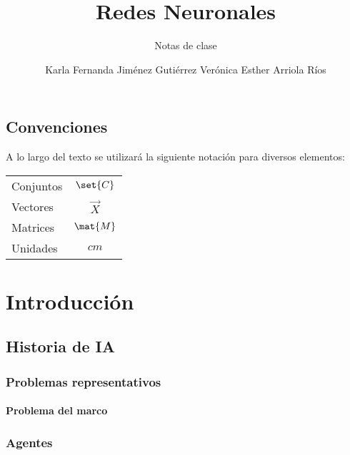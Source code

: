 \documentclass[12pt,openany]{book}
\title{Redes Neuronales}
\subtitle{Notas de clase}
\author{Karla Fernanda Jiménez Gutiérrez\newline
        Verónica Esther Arriola Ríos}
\begin{document}
\maketitle

\frontmatter %
\tableofcontents
\clearemptydoublepage %


\mainmatter  %


\chapter*{Convenciones}

A lo largo del texto se utilizará la siguiente notación para diversos elementos:
\begin{longtable}{lc}
 Conjuntos   &   $\set{C}$ \\
 Vectores    &   $\vec{X}$ \\
 Matrices    &   $\mat{M}$ \\
 Unidades    &   $\unit{cm}$
\end{longtable}



\part{Introducción}
\chapter{Historia de IA}
\section{Problemas representativos}
\subsection{Problema del marco}

\section{Agentes}
\end{document}
